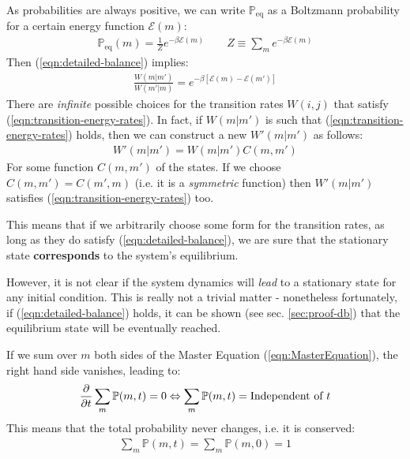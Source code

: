 \documentclass[../../main.tex]{subfiles}
\begin{document}
As probabilities are always positive, we can write $\mathbb{P}_{\mathrm{eq}}$ as a Boltzmann probability for a certain energy function $\mathcal{E}(m)$:
\begin{align*}
    \mathbb{P}_{\mathrm{eq}}(m) = \frac{1}{Z} e^{-\beta \mathcal{E}(m)} \qquad Z \equiv \sum_{m} e^{-\beta \mathcal{E}(m)}
\end{align*}
Then (\ref{eqn:detailed-balance}) implies:
\begin{align}\label{eqn:transition-energy-rates}
    \frac{W(m|m')}{W(m'|m)} = e^{-\beta [\mathcal{E}(m) - \mathcal{E}(m')]} 
\end{align}
There are \textit{infinite} possible choices for the transition rates $W(i,j)$ that satisfy (\ref{eqn:transition-energy-rates}). In fact, if $W(m|m')$ is such that (\ref{eqn:transition-energy-rates}) holds, then we can construct a new $W'(m|m')$ as follows:
\begin{align*}
    W'(m|m') = W(m|m') C(m,m')
\end{align*}
For some function $C(m,m')$ of the states. If we choose $C(m,m') = C(m',m)$ (i.e. it is a \textit{symmetric} function)
then $W'(m|m')$ satisfies (\ref{eqn:transition-energy-rates}) too.

This means that if we arbitrarily choose some form for the transition rates, as long as they do satisfy (\ref{eqn:detailed-balance}), we are sure that the stationary state \textbf{corresponds} to the system's equilibrium.

\medskip

However, it is not clear if the system dynamics will \textit{lead} to a stationary state for any initial condition. This is really not a trivial matter - nonetheless fortunately, if (\ref{eqn:detailed-balance}) holds, it can be shown (see sec. \ref{sec:proof-db}) that the equilibrium state will be eventually reached. 

\medskip

If we sum over $m$ both sides of the Master Equation (\ref{eqn:MasterEquation}), the right hand side vanishes, leading to:
\begin{align*}
    \pdv{t} \sum_m \mathbb{P}(m,t) = 0 \Leftrightarrow \sum_{m} \mathbb{P}(m,t) = \text{Independent of $t$}
\end{align*}
This means that the total probability never changes, i.e. it is conserved:
\begin{align}\label{eqn:conservation-of-probability}
    \sum_{m} \mathbb{P}(m,t) = \sum_{m} \mathbb{P}(m,0) = 1
\end{align}
\end{document}
